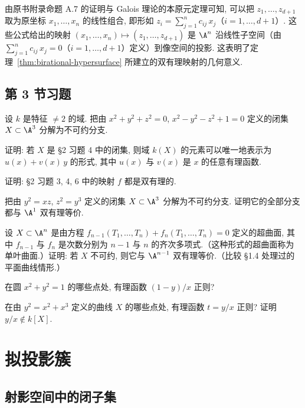 \begin{remark}\label{rem:primitive-element}
	由原书附录命题 A.7 的证明与 Galois 理论的本原元定理可知, 可以把 $z_1, \ldots, z_{d+1}$ 取为原坐标 $x_1, \ldots, x_n$ 的线性组合, 即形如 $z_i = \sum_{j=1}^{n} c_{ij}\, x_j$（$i = 1, \ldots, d+1$）. 这些公式给出的映射 $(x_1, \ldots, x_n) \mapsto (z_1, \ldots, z_{d+1})$ 是 $\A^n$ 沿线性子空间（由 $\sum_{j=1}^n c_{ij}\, x_j = 0$（$i = 1, \ldots, d+1$）定义）到像空间的投影. 这表明了定理~\ref{thm:birational-hypersurface} 所建立的双有理映射的几何意义.
\end{remark}

\subsection{第 3 节习题}

\begin{compactenum}
	\item 设 $k$ 是特征 $\ne 2$ 的域. 把由 $x^2 + y^2 + z^2 = 0$, $x^2 - y^2 - z^2 + 1 = 0$ 定义的闭集 $X \subset \A^3$ 分解为不可约分支.
	\item 证明: 若 $X$ 是 §2 习题 4 中的闭集, 则域 $k(X)$ 的元素可以唯一地表示为 $u(x) + v(x)\, y$ 的形式, 其中 $u(x)$ 与 $v(x)$ 是 $x$ 的任意有理函数.
	\item 证明: §2 习题 3, 4, 6 中的映射 $f$ 都是双有理的.
	\item 把由 $y^2 = xz$, $z^2 = y^3$ 定义的闭集 $X \subset \A^3$ 分解为不可约分支. 证明它的全部分支都与 $\A^1$ 双有理等价.
	\item 设 $X \subset \A^n$ 是由方程 $f_{n-1}(T_1, \ldots, T_n) + f_n(T_1, \ldots, T_n) = 0$ 定义的超曲面, 其中 $f_{n-1}$ 与 $f_n$ 是次数分别为 $n-1$ 与 $n$ 的齐次多项式.（这种形式的超曲面称为单叶曲面.）证明: 若 $X$ 不可约, 则它与 $\A^{n-1}$ 双有理等价.（比较 §1.4 处理过的平面曲线情形.）
	\item 在圆 $x^2 + y^2 = 1$ 的哪些点处, 有理函数 $(1-y)/x$ 正则?
	\item 在由 $y^2 = x^2 + x^3$ 定义的曲线 $X$ 的哪些点处, 有理函数 $t = y/x$ 正则? 证明 $y/x \notin k[X]$.
\end{compactenum}
\section{拟投影簇}

\subsection{射影空间中的闭子集}

